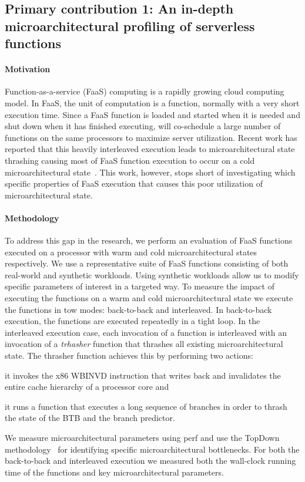\documentclass[../main.tex]{subfiles}
\begin{document}
\begin{refsection}
\subsection{Primary contribution 1: An in-depth microarchitectural profiling of serverless functions}


\paragraph{Motivation} Function-as-a-service (FaaS) computing is a rapidly growing cloud computing model. In FaaS, the unit of computation is a function, normally with a very short execution time. Since a FaaS function is loaded and started when it is needed and shut down when it has finished executing, will co-schedule a large number of functions on the same processors to maximize server utilization. Recent work has reported that this heavily interleaved execution leads to microarchitectural state thrashing causing most of FaaS function execution to occur on a cold microarchitectural state~\cite{shahrad19_archit_implic_funct_servic_comput,lukewarm_serverless}. This work, however, stops short of investigating which specific properties of FaaS execution that causes this poor utilization of microarchitectural state.

\paragraph{Methodology}
To address this gap in the research, we perform an evaluation of FaaS
functions executed on a processor with warm and cold
microarchitectural states respectively. We use a representative suite
of FaaS functions consisting of both real-world and synthetic
workloads. Using synthetic workloads allow us to modify specific
parameters of interest in a targeted way. To measure the impact of
executing the functions on a warm and cold microarchitectural state we
execute the functions in tow modes: back-to-back and interleaved. In
back-to-back execution, the functions are executed repeatedly in a
tight loop. In the interleaved execution case, each invocation of a
function is interleaved with an invocation of a \emph{trhasher}
function that thrashes all existing microarchitectural state. The
thrasher function achieves this by performing two
actions:
\begin{inparaenum}[1)]
\item it invokes the x86 WBINVD
  instruction that writes back and invalidates the entire cache
  hierarchy of a processor core and \item it runs a function that
  executes a long sequence of branches in order to thrash the state of
  the BTB and the branch predictor. \end{inparaenum} We measure
microarchitectural parameters using perf and use the TopDown
methodology~\cite{yasin14_top_down} for identifying specific
microarchitectural bottlenecks. For both the back-to-back and
interleaved execution we measured both the wall-clock running time of
the functions and key microarchitectural parameters.


\end{refsection}
\end{document}
